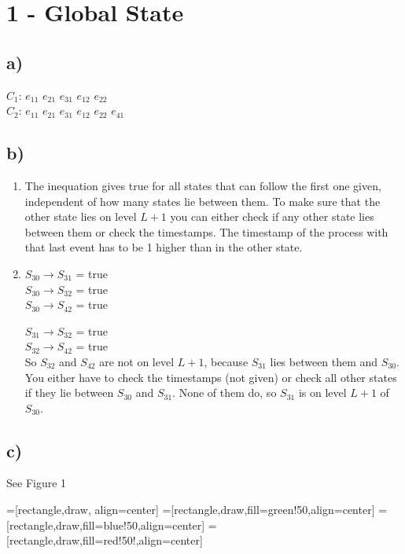 \documentclass{scrartcl}
\author{Felix Bühler\\2973410 \and Clemens Lieb\\3130838 \and Steffen Wonner\\2862123 \and Fabian Bühler\\2953320}
\title{\gettitle}
\subtitle{\getsubtitle}
\begin{document}
\maketitle

\section*{1 - Global State}
\subsection*{a)}
$C_{1}$: $e_{11}$ $e_{21}$ $e_{31}$ $e_{12}$ $e_{22}$\\
$C_{2}$: $e_{11}$ $e_{21}$ $e_{31}$ $e_{12}$ $e_{22}$ $e_{41}$

\subsection*{b)}
\begin{enumerate}[label=(\roman*)]
\item
The inequation gives true for all states that can follow the first one given, independent of how many states lie between them.
To make sure that the other state lies on level \(L+1\) you can either check if any other state lies between them or check the timestamps.
The timestamp of the process with that last event has to be 1 higher than in the other state.
\item
$S_{30} \rightarrow S_{31}$ = true\\
$S_{30} \rightarrow S_{32}$ = true\\
$S_{30} \rightarrow S_{42}$ = true

$S_{31} \rightarrow S_{32}$ = true\\
$S_{32} \rightarrow S_{42}$ = true\\

So $S_{32}$ and $S_{42}$ are not on level \(L+1\), because $S_{31}$ lies between them and $S_{30}$.\\
You either have to check the timestamps (not given) or check all other states if they lie between $S_{30}$ and $S_{31}$. 
None of them do, so $S_{31}$ is on level \(L+1\) of $S_{30}$.
\end{enumerate}
\subsection*{c)} See Figure 1

=[rectangle,draw, align=center]
=[rectangle,draw,fill=green!50,align=center]
=[rectangle,draw,fill=blue!50,align=center]
=[rectangle,draw,fill=red!50!,align=center]
\end{document}
